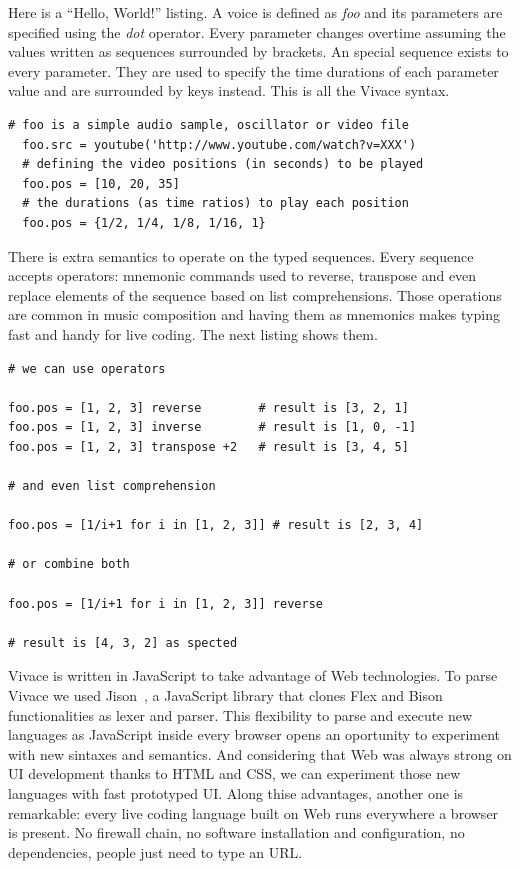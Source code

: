 \documentclass[letterpaper, 12pt]{article}
\begin{document}
Here is a ``Hello, World!'' listing. A voice is defined as \textit{foo} and its parameters are specified using the \textit{dot} operator. Every parameter changes overtime assuming the values written as sequences surrounded by brackets. An special sequence exists to every parameter. They are used to specify the time durations of each parameter value and are surrounded by keys instead. This is all the Vivace syntax.

\begin{Verbatim}[fontfamily=courier, xleftmargin=\parindent]
  # foo is a simple audio sample, oscillator or video file
  foo.src = youtube('http://www.youtube.com/watch?v=XXX')
  # defining the video positions (in seconds) to be played
  foo.pos = [10, 20, 35]
  # the durations (as time ratios) to play each position
  foo.pos = {1/2, 1/4, 1/8, 1/16, 1}
\end{Verbatim}

There is extra semantics to operate on the typed sequences. Every
sequence accepts operators: mnemonic commands used to reverse,
transpose and even replace elements of the sequence based on list
comprehensions. Those operations are common in music composition and
having them as mnemonics makes typing fast and handy for live
coding. The next listing shows them.

\begin{Verbatim}[fontfamily=courier, xleftmargin=\parindent]
# we can use operators

foo.pos = [1, 2, 3] reverse        # result is [3, 2, 1]
foo.pos = [1, 2, 3] inverse        # result is [1, 0, -1]
foo.pos = [1, 2, 3] transpose +2   # result is [3, 4, 5]

# and even list comprehension

foo.pos = [1/i+1 for i in [1, 2, 3]] # result is [2, 3, 4]

# or combine both

foo.pos = [1/i+1 for i in [1, 2, 3]] reverse 

# result is [4, 3, 2] as spected
\end{Verbatim}

Vivace is written in JavaScript to take advantage of Web technologies.
To parse Vivace we used Jison~\cite{jison}, a JavaScript library that
clones Flex and Bison functionalities as lexer and parser. This
flexibility to parse and execute new languages as JavaScript inside
every browser opens an oportunity to experiment with new sintaxes and
semantics. And considering that Web was always strong on UI
development thanks to HTML and CSS, we can experiment those new
languages with fast prototyped UI. Along thise advantages, another one
is remarkable: every live coding language built on Web runs everywhere
a browser is present. No firewall chain, no software installation and
configuration, no dependencies, people just need to type an URL.
\end{document}
